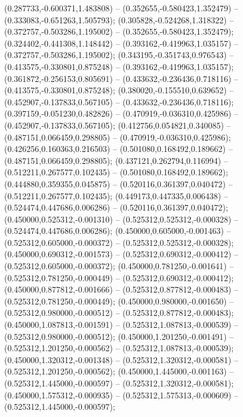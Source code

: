  (0.287733,-0.600371,1.483808) -- (0.352655,-0.580423,1.352479) -- (0.333083,-0.651263,1.505793);
 (0.305828,-0.524268,1.318322) -- (0.372757,-0.503286,1.195002) -- (0.352655,-0.580423,1.352479);
 (0.324402,-0.441308,1.148442) -- (0.393162,-0.419963,1.035157) -- (0.372757,-0.503286,1.195002);
 (0.343195,-0.351743,0.976543) -- (0.413575,-0.330801,0.875248) -- (0.393162,-0.419963,1.035157);
 (0.361872,-0.256153,0.805691) -- (0.433632,-0.236436,0.718116) -- (0.413575,-0.330801,0.875248);
 (0.380020,-0.155510,0.639652) -- (0.452907,-0.137833,0.567105) -- (0.433632,-0.236436,0.718116);
 (0.397159,-0.051230,0.482826) -- (0.470919,-0.036310,0.425986) -- (0.452907,-0.137833,0.567105);
 (0.412756,0.054821,0.340085) -- (0.487151,0.066459,0.298805) -- (0.470919,-0.036310,0.425986);
 (0.426256,0.160363,0.216503) -- (0.501080,0.168492,0.189662) -- (0.487151,0.066459,0.298805);
 (0.437121,0.262794,0.116994) -- (0.512211,0.267577,0.102435) -- (0.501080,0.168492,0.189662);
 (0.444880,0.359355,0.045875) -- (0.520116,0.361397,0.040472) -- (0.512211,0.267577,0.102435);
 (0.449173,0.447335,0.006438) -- (0.524474,0.447686,0.006286) -- (0.520116,0.361397,0.040472);
 (0.450000,0.525312,-0.001310) -- (0.525312,0.525312,-0.000328) -- (0.524474,0.447686,0.006286);
 (0.450000,0.605000,-0.001463) -- (0.525312,0.605000,-0.000372) -- (0.525312,0.525312,-0.000328);
 (0.450000,0.690312,-0.001573) -- (0.525312,0.690312,-0.000412) -- (0.525312,0.605000,-0.000372);
 (0.450000,0.781250,-0.001641) -- (0.525312,0.781250,-0.000449) -- (0.525312,0.690312,-0.000412);
 (0.450000,0.877812,-0.001666) -- (0.525312,0.877812,-0.000483) -- (0.525312,0.781250,-0.000449);
 (0.450000,0.980000,-0.001650) -- (0.525312,0.980000,-0.000512) -- (0.525312,0.877812,-0.000483);
 (0.450000,1.087813,-0.001591) -- (0.525312,1.087813,-0.000539) -- (0.525312,0.980000,-0.000512);
 (0.450000,1.201250,-0.001491) -- (0.525312,1.201250,-0.000562) -- (0.525312,1.087813,-0.000539);
 (0.450000,1.320312,-0.001348) -- (0.525312,1.320312,-0.000581) -- (0.525312,1.201250,-0.000562);
 (0.450000,1.445000,-0.001163) -- (0.525312,1.445000,-0.000597) -- (0.525312,1.320312,-0.000581);
 (0.450000,1.575312,-0.000935) -- (0.525312,1.575313,-0.000609) -- (0.525312,1.445000,-0.000597);
